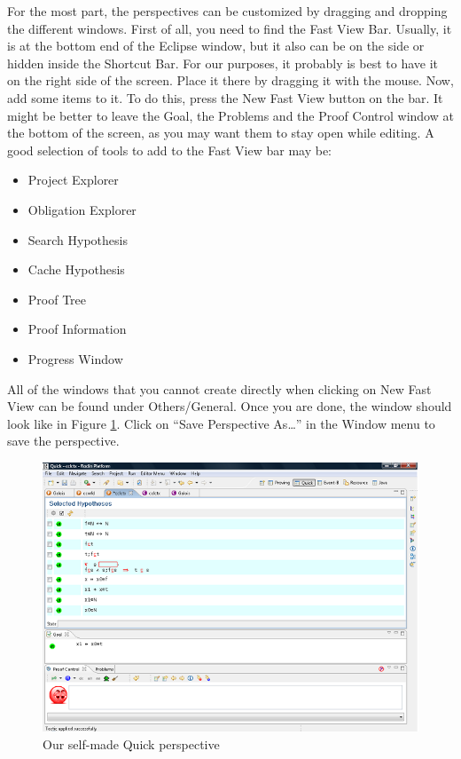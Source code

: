 For the most part, the perspectives can be customized by dragging and dropping the different windows. First of all, you need to find the Fast View Bar. Usually, it is at the bottom end of the Eclipse window, but it also can be on the side or hidden inside the Shortcut Bar. For our purposes, it probably is best to have it on the right side of the screen. Place it there by dragging it with the mouse. Now, add some items to it. To do this, press the \textsf{New Fast View} button on the bar. It might be better to leave the Goal, the Problems and the Proof Control window at the bottom of the screen, as you may want them to stay open while editing. A good selection of tools to add to the Fast View bar may be:

\begin{itemize}
	\item Project Explorer
	\item Obligation Explorer
	\item Search Hypothesis
	\item Cache Hypothesis
	\item Proof Tree
	\item Proof Information
	\item Progress Window
\end{itemize}

All of the windows that you cannot create directly when clicking on \textsf{New Fast View} can be found under \textsf{Others/General}. Once you are done, the window should look like in Figure \ref{fig_ref_10_customizing}. Click on ``Save Perspective As…'' in the Window menu to save the perspective.

\begin{figure}[!ht]
\begin{center}
	\includegraphics{img/reference/ref_10_customizing.png}
	\caption{Our self-made Quick perspective}
	\label{fig_ref_10_customizing}
\end{center}
\end{figure}

